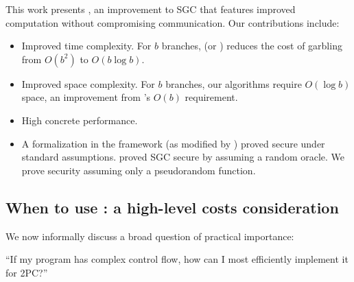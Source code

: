 \medskip
This work presents \ourschemelong, an improvement to SGC that features
improved computation without compromising communication.
Our contributions include:
\begin{itemize}
  \item Improved time complexity.
    For $b$ branches, \ourschemelong (or
    \ourscheme)  reduces the cost of garbling  from $O(b^2)$ to
    $O(b \log b)$.
  \item Improved space complexity.
    For $b$ branches, our algorithms require $O(\log b)$ space, an
    improvement from \HK's $O(b)$ requirement.
  \item High concrete performance.
  \item
    A formalization in the \cite{CCS:BelHoaRog12} framework (as
    modified by \HK) proved
    secure under standard assumptions.
    \HK proved SGC secure by assuming a random oracle.
    We prove security assuming only a pseudorandom function.
\end{itemize}



\subsection{When to use \ourschemelong: a high-level costs consideration}
\label{sec:whentouse}

We now informally discuss a broad question of
practical importance:

\begin{displayquote}
  ``If my program has complex control flow, how can I most efficiently implement it for 2PC?''
\end{displayquote}

